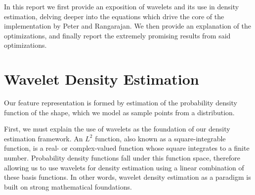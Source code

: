 \documentclass[../tech_report_1.tex]{subfiles}
\begin{document}
In this
report we first provide an exposition of  wavelets and its use in density estimation, delving deeper into the equations which drive the core of the implementation by Peter and Rangarajan. We then provide an explanation of the optimizations, and finally report the extremely promising results from said optimizations. 


\section{Wavelet Density Estimation}

Our feature representation is formed by estimation of the probability density function of the shape, which we model as sample points from a distribution. 

First, we must explain the use of wavelets as the foundation of our density estimation framework. An $L^{2}$ function, also known as a square-integrable function, is a real- or complex-valued function whose square integrates to a finite number. Probability density functions fall
under this function space, therefore allowing us to use wavelets for
density estimation using a linear combination of these basis functions. In other words, wavelet density estimation  as a paradigm is built on strong mathematical foundations.
\end{document}
